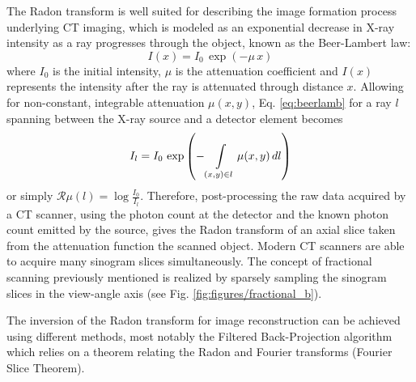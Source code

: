 The Radon transform is well suited for describing the image formation process underlying CT imaging, which is modeled as an exponential decrease in X-ray intensity as a ray progresses through the object, known as the Beer-Lambert law:
\begin{equation}
I(x) = I_0 \, \exp \left( -\mu \, x \right)
\label{eq:beerlamb}
\end{equation}
where $I_0$ is the initial intensity, $\mu$ is the attenuation coefficient and $I(x)$ represents the intensity after the ray is attenuated through distance $x$. Allowing for non-constant, integrable attenuation $\mu(x,y)$, Eq. \ref{eq:beerlamb} for a ray $l$ spanning between the X-ray source and a detector element becomes
\begin{equation}
I_l = I_0 \, \exp \left( - \int \displaylimits_{(x,y) \in l} \mu(x,y)\, dl \right)
\label{beerlamb}
\end{equation}
 or simply $\mathcal{R} \mu (l) = \log \frac{I_0}{I_l} $. Therefore, post-processing the raw data acquired by a CT scanner, using the photon count at the detector and the known photon count emitted by the source, gives the Radon transform of an axial slice taken from the attenuation function the scanned object. Modern CT scanners are able to acquire many sinogram slices simultaneously. 
 The concept of fractional scanning previously mentioned is realized by sparsely sampling the sinogram slices in the view-angle axis (see Fig. \ref{fig:figures/fractional_b}). 
 
 The inversion of the Radon transform for image reconstruction can be achieved using different methods, most notably the Filtered Back-Projection algorithm which relies on a theorem relating the Radon and Fourier transforms (Fourier Slice Theorem).
 

